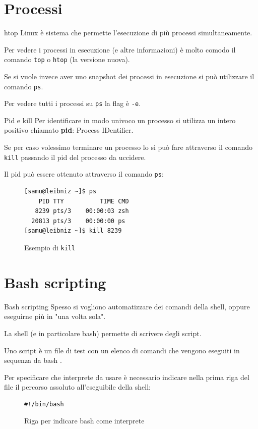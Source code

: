 \documentclass{beamer}
\begin{document}
\section{Processi}

\begin{frame}{htop}
  Linux è sistema che permette l'esecuzione di più processi simultaneamente. 
  \medskip

  Per vedere i processi in esecuzione (e altre informazioni) è molto comodo il 
  comando \texttt{top} o \texttt{htop} (la versione nuova). \medskip
  
  Se si vuole invece aver uno snapshot dei processi in esecuzione si può 
  utilizzare il comando \texttt{ps}. \medskip

  Per vedere tutti i processi su \texttt{ps} la flag è \texttt{-e}.
\end{frame}

\begin{frame}[fragile]{Pid e kill}
  Per identificare in modo univoco un processo si utilizza un intero positivo
  chiamato \textbf{pid}: Process IDentifier. \medskip \pause

  Se per caso volessimo terminare un processo lo si può fare attraverso il 
  comando \texttt{kill} passando il pid del processo da uccidere. \medskip

  Il pid può essere ottenuto attraverso il comando \texttt{ps}:
  \begin{figure}
    \begin{lstlisting}
[samu@leibniz ~]$ ps
    PID TTY          TIME CMD
   8239 pts/3    00:00:03 zsh
  20813 pts/3    00:00:00 ps
[samu@leibniz ~]$ kill 8239
    \end{lstlisting}
    \caption{Esempio di \texttt{kill}}
  \end{figure}
\end{frame}

\section{Bash scripting}

\begin{frame}[fragile]{Bash scripting}
  Spesso si vogliono automatizzare dei comandi della shell, oppure eseguirne più
  in "una volta sola". \medskip \pause

  La shell (e in particolare bash) permette di scrivere degli script. \medskip

  Uno script è un file di test con un elenco di comandi che vengono eseguiti in
  sequenza da bash
  .\medskip

  Per specificare che interprete da usare è necessario indicare nella prima riga
  del file il percorso assoluto all'eseguibile della shell: \smallskip

  \begin{figure}
    \begin{lstlisting}
#!/bin/bash
    \end{lstlisting}
    \caption{Riga per indicare bash come interprete}
  \end{figure}
\end{frame}
\end{document}
